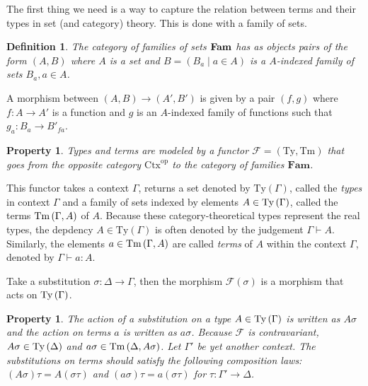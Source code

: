 \documentclass[11pt,a4paper,twoside,xetex,draft]{book}
\newcommand{\keyword}[1]{\emph{#1}\index{#1}}
\newtheorem{definition}[theorem]{Definition}
\newtheorem{property}[theorem]{Property}
\begin{document}
The first thing we need is a way to capture the relation between terms and their types in set (and category) theory. This is done with a family of sets. 

\begin{definition}
The category of  \keyword{families of sets} $ \text{\textbf{Fam}}$ has as objects pairs of the form $\left(A,B\right)$ where $A$ is a set and $B=\left(B_{a}\mid a\in A\right)$ is a $A$-indexed family of sets $B_{a},a\in A$. 
\end{definition}

A morphism between $\left(A,B\right)\rightarrow\left(A',B'\right)$ is given by a pair $\left(f,g\right)$ where $f:A\rightarrow A'$ is a function and $g$ is an $A$-indexed family of functions such that $g_{a}:B_{a}\rightarrow B'_{fa}$.


\begin{property}\label{type_functor} Types and terms are modeled by a functor $\mathcal{F}=\left(\text{Ty},\text{Tm}\right)$ that goes from the opposite category $\text{Ctx}^{\text{op}}$ to the category of families $\textbf{Fam}$.
\end{property}

This functor takes a context $\Gamma$, returns a set denoted by $\text{Ty}\left(\Gamma\right)$, called the \keyword{types} in context $\Gamma$ and a family of sets indexed by elements $A\in\text{Ty}\left(\Gamma\right)$, called the terms $\text{Tm}\left(\Gamma,A\right)$ of $A$. Because these category-theoretical types represent the real types, the depdency $A \in \text{Ty}(\Gamma)$ is often denoted by the judgement $\Gamma\vdash A$. Similarly, the elements $a\in\text{Tm}\left(\Gamma,A\right)$ are called \keyword{terms} of $A$ within the context $\Gamma$, denoted by $\Gamma\vdash a:A$.

 Take a substitution $\sigma:\Delta\rightarrow\Gamma$, then the morphism $\mathcal{F}(\sigma)$ is a morphism that acts on $\text{Ty}\left(\Gamma\right)$. 

\begin{property}\label{composition_laws}
The action of a substitution on a type $A\in\text{Ty}\left(\Gamma\right)$ is written as $A\sigma$ and the action on terms $a$ is written as $a\sigma$. Because $\mathcal{F}$ is contravariant, $A \sigma\in \text{Ty}\left(\Delta\right)$ and $a \sigma \in \text{Tm}\left(\Delta,A \sigma\right)$. Let $\Gamma '$ be yet another context. The substitutions on terms should satisfy
the following composition laws: $\left(A\sigma\right)\tau=A\left(\sigma\tau\right)$
and $\left(a\sigma\right)\tau=a\left(\sigma\tau\right)$ for $\tau:\Gamma'\rightarrow\Delta$.
\end{property}
\end{document}
